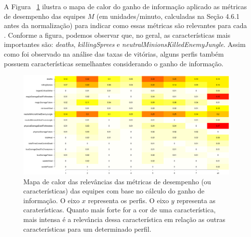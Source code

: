 A Figura ~\ref{fig:relevance} ilustra o mapa de calor do ganho de informação aplicado as métricas de desempenho das equipes $M$ (em unidades/minuto, calculadas na Seção 4.6.1 antes da normalização) para indicar como essas métricas são relevantes para cada . Conforme a figura, podemos observar que, no geral, as características mais importantes são: \textit{deaths}, \textit{killingSprees} e \textit{neutralMinionsKilledEnemyJungle}. Assim como foi observado na análise das taxas de vitórias, alguns perfis também possuem características semelhantes considerando o ganho de informação.

\begin{figure}
\includegraphics[width=1\textwidth,height=\textheight,keepaspectratio]{relevance}
\caption{Mapa de calor das relevâncias das métricas de desempenho (ou características) das equipes com base no cálculo do ganho de informação. O eixo $x$ representa os perfis. O eixo $y$ representa as caraterísticas. Quanto mais forte for a cor de uma característica, mais intensa \'e a relevância dessa caracter\'istica em rela\c{c}\~ao as outras caracter\'isticas para um determinado perfil.}
\label{fig:relevance}
\end{figure}

